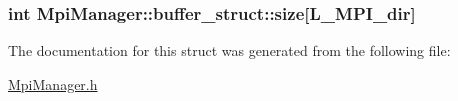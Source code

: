 \subsubsection[{\texorpdfstring{size}{size}}]{\setlength{\rightskip}{0pt plus 5cm}int Mpi\+Manager\+::buffer\+\_\+struct\+::size\mbox{[}{\bf L\+\_\+\+M\+P\+I\+\_\+dir}\mbox{]}}\hypertarget{struct_mpi_manager_1_1buffer__struct_aea0037fce808f601ae9c1e48926dbd0e}{}\label{struct_mpi_manager_1_1buffer__struct_aea0037fce808f601ae9c1e48926dbd0e}


The documentation for this struct was generated from the following file\+:\begin{DoxyCompactItemize}
\item 
\hyperlink{_mpi_manager_8h}{Mpi\+Manager.\+h}\end{DoxyCompactItemize}
